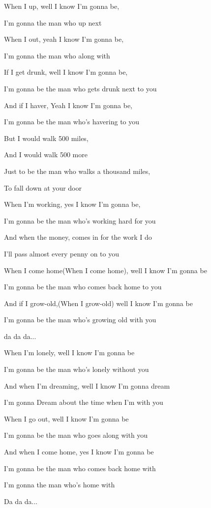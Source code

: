 

\zs
When I  up, well I know I'm gonna be,

I'm gonna  the man who  up next 

When I  out, yeah I know I'm gonna be,

I'm gonna  the man who  along with 

\ks

\zs
If I get drunk, well I know I'm gonna be,

I'm gonna be the man who gets drunk next to you

And if I haver, Yeah I know I'm gonna be,

I'm gonna be the man who's havering to you
\ks

\zr
But I would walk 500 miles,

And I would walk 500 more

Just to be the man who walks a thousand miles,

To fall down at your door
\kr

\zs
When I'm working, yes I know I'm gonna be,

I'm gonna be the man who's working hard for you

And when the money, comes in for the work I do

I'll pass almost every penny on to you
\ks

\zs
When I come home(When I come home), well I know I'm gonna be

I'm gonna be the man who comes back home to you

And if I grow-old,(When I grow-old) well I know I'm gonna be

I'm gonna be the man who's growing old with you
\ks

\zr \kr

da da da...


\zs
When I'm lonely, well I know I'm gonna be

I'm gonna be the man who's lonely without you

And when I'm dreaming, well I know I'm gonna dream

I'm gonna Dream about the time when I'm with you
\ks

\zs
When I go out, well I know I'm gonna be

I'm gonna be the man who goes along with you

And when I come home, yes I know I'm gonna be

I'm gonna be the man who comes back home with 

I'm gonna  the man who's  home with 
\ks

\zr \kr

Da da da...

\zr \kr
\kp






















